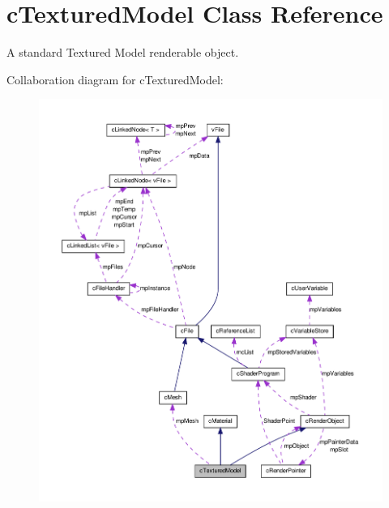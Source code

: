 \hypertarget{classc_textured_model}{
\section{cTexturedModel Class Reference}
\label{classc_textured_model}
}


A standard Textured Model renderable object.  




Collaboration diagram for cTexturedModel:\nopagebreak
\begin{figure}[H]
\begin{center}
\leavevmode
\includegraphics[width=400pt]{classc_textured_model__coll__graph}
\end{center}
\end{figure}
